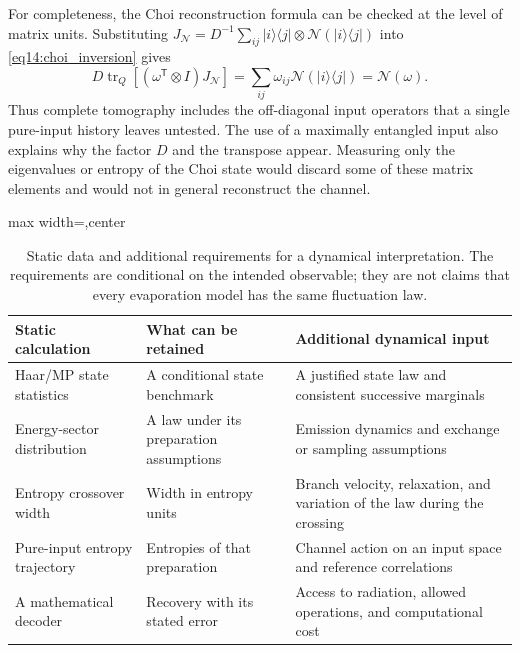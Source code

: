 \documentclass[11pt,letterpaper]{article}
\theoremstyle{plain}
\theoremstyle{definition}
\theoremstyle{remark}
\DeclareMathOperator{\tr}{tr}
\begin{document}
For completeness, the Choi reconstruction formula can be checked at
the level of matrix units. Substituting
$J_{\mathcal N}=D^{-1}\sum_{ij}|i\rangle\langle j|\otimes
\mathcal N(|i\rangle\langle j|)$ into
\eqref{eq14:choi_inversion} gives
\begin{equation}
 D\tr_Q[(\omega^{\mathsf T}\otimes I)J_{\mathcal N}]
 =\sum_{ij}\omega_{ij}\mathcal N(|i\rangle\langle j|)
 =\mathcal N(\omega).
 \label{eq14:choi_contraction}
\end{equation}
Thus complete tomography includes the off-diagonal input operators
that a single pure-input history leaves untested. The use of a
maximally entangled input also explains why the factor $D$ and the
transpose appear. Measuring only the eigenvalues or entropy of the
Choi state would discard some of these matrix elements and would not
in general reconstruct the channel.

\begin{table}[tbp]
\centering
\caption{Static data and additional requirements for a dynamical
interpretation. The requirements are conditional on the intended
observable; they are not claims that every evaporation model has the
same fluctuation law.}
\label{tab14:equilibrium_vs_evaporation}
\begin{adjustbox}{max width=\textwidth,center}
\begin{tabular}{p{}p{}p{}}
\toprule
Static calculation & What can be retained & Additional dynamical input \\
\midrule
Haar/MP state statistics & A conditional state benchmark & A justified
state law and consistent successive marginals \\[4pt]
Energy-sector distribution & A law under its preparation assumptions &
Emission dynamics and exchange or sampling assumptions \\[4pt]
Entropy crossover width & Width in entropy units & Branch velocity,
relaxation, and variation of the law during the crossing \\[4pt]
Pure-input entropy trajectory & Entropies of that preparation & Channel
action on an input space and reference correlations \\[4pt]
A mathematical decoder & Recovery with its stated error & Access to
radiation, allowed operations, and computational cost \\
\bottomrule
\end{tabular}
\end{adjustbox}
\end{table}
\end{document}
